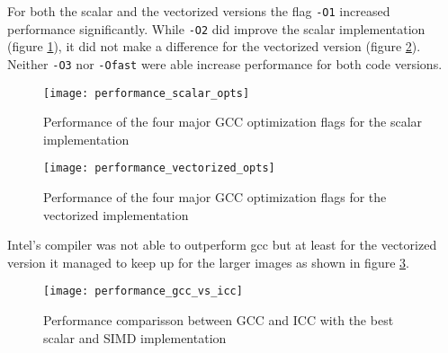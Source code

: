 For both the scalar and the vectorized versions the flag \texttt{-O1} increased
performance significantly. While \texttt{-O2} did improve the scalar
implementation (figure \ref{fig:perf_scal}), it did not make a difference for
the vectorized version (figure \ref{fig:perf_vec}). Neither \texttt{-O3} nor
\texttt{-Ofast} were able increase performance for both code versions.

\begin{figure}[H]
  \centering
  \texttt{[image: performance\_scalar\_opts]}
  \caption{Performance of the four major GCC optimization flags for the scalar implementation}
  \label{fig:perf_scal}
\end{figure}

\begin{figure}[H]
    \centering
    \texttt{[image: performance\_vectorized\_opts]}
    \caption{Performance of the four major GCC optimization flags for the vectorized implementation}
    \label{fig:perf_vec}
  \end{figure}



Intel's compiler was not able to outperform gcc but at least for the vectorized
version it managed to keep up for the larger images as shown in figure
\ref{fig:perf_gcc_vs_icc}.

\begin{figure}[H]
  \centering
  \texttt{[image: performance\_gcc\_vs\_icc]}
  \caption{Performance comparisson between GCC and ICC with the best scalar and
    SIMD implementation}
  \label{fig:perf_gcc_vs_icc}
\end{figure}

